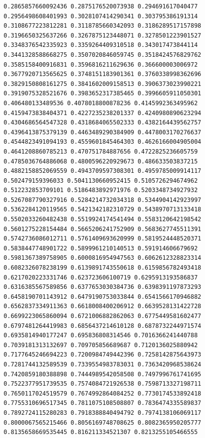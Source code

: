 \documentclass [11pt]{book}
\begin{document}
\begin{itemize}
\begin{figure}
\begin{lrbox}{\boxedverb}
\begin{minipage}{\linewidth}
{\begin{verbatim}
  0.2865857660092436 0.2875176520073938 0.294691617040477
  0.2956498608401993 0.3028107414290341 0.303795386191314
  0.3108677223812281 0.3118785660342093 0.3186289517157898
  0.3196650325637266 0.3267875123448071 0.3278501223901527
  0.3348376542335923 0.3359264409310518 0.343017473844114
  0.3441328588668275 0.3507020846059745 0.3518424576829762
  0.3585158400916831 0.3596816211629636 0.366600003006972
  0.3677920713565625 0.3748151183901361 0.3760338998362696
  0.3829150808161275 0.3841602009158513 0.3906373023990221
  0.3919075328521676 0.3983652317385465 0.3996605911050301
  0.406480133489536 0.4078018800878236 0.4145992363495962
  0.4159473838404371 0.4227235238201337 0.4240980890623294
  0.4304686564547328 0.4318684065502333 0.4382164439562757
  0.4396413875379139 0.4463489290384909 0.4478003170276637
  0.4544823491094193 0.4559601845464303 0.4626166004905004
  0.4641208860785213 0.470751784887656 0.4722825236605759
  0.4785036764886068 0.4800596220929673 0.486633503837215
  0.4882158852069559 0.4943709597308301 0.4959785009914117
  0.502479159396033 0.5041130660952415 0.5105726294674962
  0.512232853709101 0.5186483892971976 0.5203348734927932
  0.5267087790327916 0.5284214732034318 0.5344904142923997
  0.5362284120119565 0.5421342182310729 0.5438970713133418
  0.5502033260482438 0.5519924174541494 0.5583120642198542
  0.5601275228154484 0.5665206241752909 0.5683627745511391
  0.5742736086012711 0.5761409693620999 0.5819524448520371
  0.5838447748901722 0.5899961210140513 0.591914606679692
  0.5981367389758905 0.6000816954947563 0.6062612328823314
  0.6082326078238199 0.6139891743550618 0.6159856782493418
  0.6217020223331746 0.623723606100719 0.6295913193586837
  0.6316385567589856 0.6377653030384736 0.6398391197873293
  0.6458190701143912 0.6479190753033844 0.6541566170946882
  0.6562837334911363 0.6618008400206912 0.6639528131422728
  0.6699223065860094 0.6721006882862063 0.6775449581602477
  0.6797481264419983 0.6856437214610128 0.6878732244971574
  0.6935814940177247 0.695836808314546 0.7016366241440788
  0.7039181313132697 0.709705856689687 0.7120136025880942
  0.7177645246694223 0.7200984749442396 0.7258142875643973
  0.7281744132589539 0.7339554983783031 0.7363420968538624
  0.7420859180388898 0.7444989542058508 0.7497996761741695
  0.7522377951739535 0.7574084721926538 0.7598713327198711
  0.7650117024519579 0.7674992864084252 0.7730174533892418
  0.7755310696517345 0.7811075108508807 0.7836474335589837
  0.7892724115280283 0.7918388840494792 0.7974138106069117
  0.8000067565215466 0.8056169748708625 0.8082365950205777
  0.8135658669535445 0.816211334521307 0.8213255105466555

\end{verbatim}}
\end{minipage}
\end{lrbox}
\end{figure}
\end{itemize}
\end{document}
